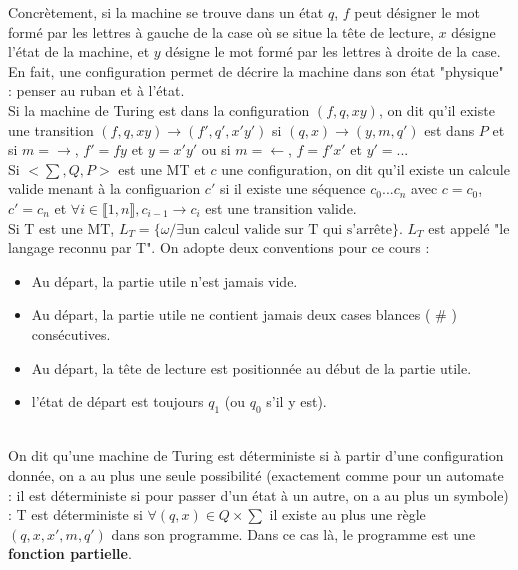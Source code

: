 \documentclass{article}
\begin{document}
Concrètement, si la machine se trouve dans un état $q$, $f$
peut désigner le mot formé par les lettres à gauche de la case où se situe la tête de lecture, $x$ désigne l'état de la machine, et $y$ désigne le mot formé par les lettres à droite de la case. En fait, une configuration permet de décrire la machine dans son état "physique" : penser au ruban et à l'état. \\ 
Si la machine de Turing est dans la configuration $(f,q,xy)$, on dit qu'il existe une transition $ (f,q,xy) \rightarrow (f',q',x'y')$ si $ (q,x) \rightarrow (y,m,q')$ est dans $P$ et si $m = \rightarrow$, $f' = fy$ et $y = x'y'$ ou si $m = \leftarrow$, $f = f'x'$ et $y' = $... \\ 
Si $<\sum, Q, P> $ est une MT et $c$ une configuration, on dit qu'il existe un calcule valide menant à la configuarion  $c'$ si il existe une séquence $c_0 ... c_n$ avec $c = c_0$, $c' = c_n$ et $\forall i \in \llbracket 1, n \rrbracket, c_{i-1} \rightarrow c_i$ est une transition valide. \\ 


Si T est une MT, $ L_T = \{ \omega / \exists \text{un calcul valide sur T qui s'arrête} \} $. $L_T$ est appelé "le langage reconnu par T". On adopte deux conventions pour ce cours : 
\begin{itemize}
    \item Au départ, la partie utile n'est jamais vide.
    \item Au départ, la partie utile ne contient jamais deux cases blances ( $\#$ ) consécutives.
    \item Au départ, la tête de lecture est positionnée au début de la partie utile.
    \item l'état de départ est toujours $q_1$ (ou $q_0$ s'il y est).
\end{itemize} \\ 
On dit qu'une machine de Turing est déterministe si à partir d'une configuration donnée, on a au plus une seule possibilité (exactement comme pour un automate : il est déterministe si pour passer d'un état à un autre, on a au plus un symbole) : T est déterministe si $ \forall (q,x) \in Q \times \sum $ il existe au plus une règle $(q,x,x',m,q')$ dans son programme. Dans ce cas là, le programme est une \textbf{fonction partielle}. \\
\end{document}
